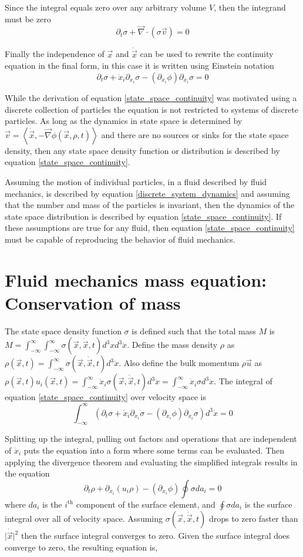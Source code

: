 \documentclass[%
 twocolumn,
 preprint, onecolumn,
 amsmath,amssymb,
 aps,
]{revtex4-1}
\newcommand{\dvec}[1]{\dot{\vec{#1}}}
\newcommand{\grad}{\vec{\nabla}}
\newcommand{\intVdot}[1]{\int_{-\infty}^{\infty} #1 d^3\dot{x}}
\newcommand{\intVVdot}[1]{\int_{-\infty}^{\infty}\int_{-\infty}^{\infty} #1 d^3xd^3\dot{x}}
\begin{document}
Since the integral equals zero over any arbitrary volume $V$, then the integrand must be zero
\[
\partial_t \sigma + \grad\cdot\left(\sigma\vec{v}\right)=0
\]

Finally the independence of $\vec{x}$ and $\dvec{x}$ can be used to rewrite the continuity equation in the final form, in this case it is written using Einstein notation
\begin{equation}
\partial_t \sigma + \dot{x}_i\partial_{x_i}\sigma-\left(\partial_{x_i}\phi\right)\partial_{\dot{x}_i}\sigma=0
\label{state_space_continuity}
\end{equation}

While the derivation of equation \eqref{state_space_continuity} was motivated using a discrete collection of particles the equation is not restricted to systems of discrete particles. As long as the dynamics in state space is determined by $\vec{v}=\left\langle\dvec{x}, -\grad\phi(\vec{x}, \rho, t)\right\rangle$ and there are no sources or sinks for the state space density, then any state space density function or distribution is described by equation \eqref{state_space_continuity}.

Assuming the motion of individual particles, in a fluid described by fluid mechanics, is described by equation \eqref{discrete_system_dynamics} and assuming that the number and mass of the particles is invariant, then the dynamics of the state space distribution is described by equation \eqref{state_space_continuity}. If these assumptions are true for any fluid, then equation \eqref{state_space_continuity} must be capable of reproducing the behavior of fluid mechanics.

\section{Fluid mechanics mass equation: Conservation of mass}
The state space density function $\sigma$ is defined such that the total mass $M$ is $M=\intVVdot{\sigma(\vec{x}, \dvec{x}, t)}$. Define the mass density $\rho$ as $\rho(\vec{x}, t)=\intVdot{\sigma(\vec{x}, \dvec{x}, t)}$. Also define the bulk momentum $\rho\vec{u}$ as $\rho(\vec{x}, t) u_i(\vec{x}, t)=\intVdot{\dot{x}_i\sigma(\vec{x}, \dvec{x}, t)}=\intVdot{\dot{x}_i\sigma}$. The integral of equation \eqref{state_space_continuity} over velocity space is
\[
\intVdot{\left(\partial_t \sigma + \dot{x}_i\partial_{x_i}\sigma-\left(\partial_{x_i}\phi\right)\partial_{\dot{x}_i}\sigma\right)}=0
\]

Splitting up the integral, pulling out factors and operations that are independent of $\dot{x}_i$ puts the equation into a form where some terms can be evaluated. Then applying the divergence theorem and evaluating the simplified integrals results in the equation
\[
\partial_t\rho + \partial_{x_i}\left(u_i\rho\right)-\left(\partial_{x_i}\phi\right)\oint{\sigma da_i}=0
\]
where $da_i$ is the $i^{\text{th}}$ component of the surface element, and $\oint{\sigma da_i}$ is the surface integral over all of velocity space. Assuming $\sigma(\vec{x}, \dvec{x}, t)$ drops to zero faster than $\lvert\dvec{x}\rvert^2$ then the surface integral converges to zero. Given the surface integral does converge to zero, the resulting equation is, 
\end{document}
